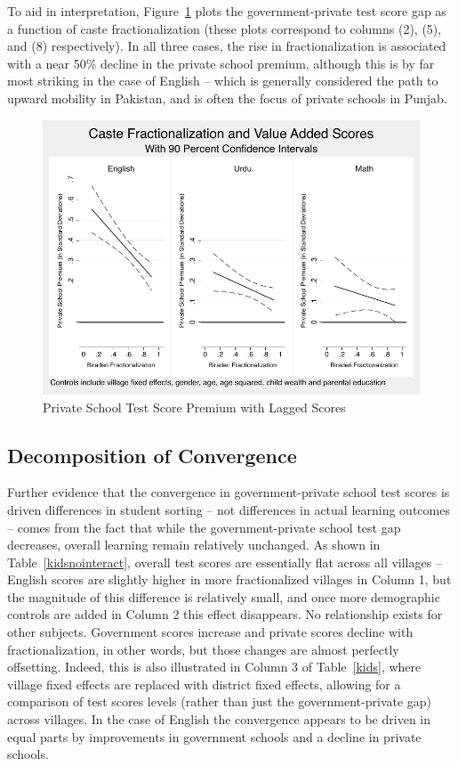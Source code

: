 \documentclass[Eubank_pk_ethnic_sorting.tex]{subfiles}
\begin{document}


To aid in interpretation, Figure~\ref{kidscombined} plots the government-private test score gap as a function of caste fractionalization (these plots correspond to columns (2), (5), and (8) respectively). In all three cases, the rise in fractionalization is associated with a near 50\% decline in the private school premium, although this is by far most striking in the case of English -- which is generally considered the path to upward mobility in Pakistan, and is often the focus of private schools in Punjab. 

\begin{figure}[h]
	\caption{Private School Test Score Premium with Lagged Scores}\label{kidscombined}
	\centering	
	\includegraphics[scale=0.8]{../graphs/kids_combined.pdf}
\end{figure}


\subsection{Decomposition of Convergence}\label{}

Further evidence that the convergence in government-private school test scores is driven differences in student sorting -- not differences in actual learning outcomes -- comes from the fact that while the government-private school test gap decreases, overall learning remain relatively unchanged. As shown in Table~\ref{kidsnointeract}, overall test scores are essentially flat across all villages -- English scores are slightly higher in more fractionalized villages in Column 1, but the magnitude of this difference is relatively small, and once more demographic controls are added in Column 2 this effect disappears. No relationship exists for other subjects. Government scores increase and private scores decline with fractionalization, in other words, but those changes are almost perfectly offsetting. Indeed, this is also illustrated in Column 3 of Table~\ref{kids}, where village fixed effects are replaced with district fixed effects, allowing for a comparison of test scores levels (rather than just the government-private gap) across villages. In the case of English the convergence appears to be driven in equal parts by improvements in government schools and a decline in private schools.
\end{document}
